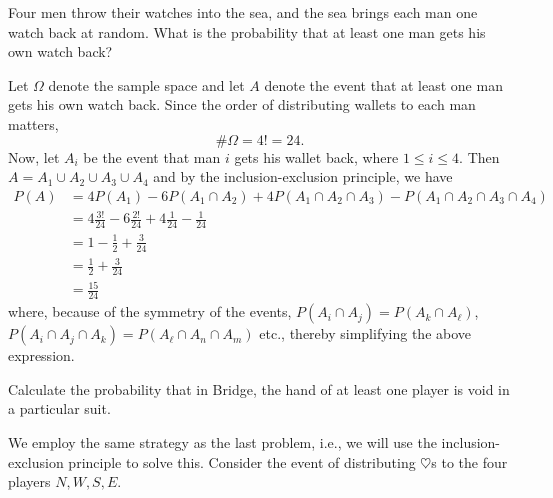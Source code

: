 \begin{problem}[Handout 2, \# 5]
  Four men throw their watches into the sea, and the sea brings each man
  one watch back at random. What is the probability that at least one man
  gets his own watch back?
\end{problem}
\begin{solution}
  Let \(\Omega\) denote the sample space and let \(A\) denote the event
  that at least one man gets his own watch back. Since the order of
  distributing wallets to each man matters,
  \[
    \#\Omega=4!=24.
  \]
  Now, let \(A_i\) be the event that man \(i\) gets his wallet back, where
  \(1\leq i\leq 4\). Then \(A=A_1\cup A_2\cup A_3\cup A_4\) and by the
  inclusion-exclusion principle, we have
  \begin{align*}
    P(A)
    &=4P(A_1)-6P(A_1\cap A_2)+4P(A_1\cap A_2\cap A_3)-P(A_1\cap A_2\cap
      A_3\cap A_4)\\
    &=4\frac{3!}{24}-6\frac{2!}{24}+4\frac{1}{24}-\frac{1}{24}\\
    &=1-\frac{1}{2}+\frac{3}{24}\\
    &=\frac{1}{2}+\frac{3}{24}\\
    &=\frac{15}{24}
  \end{align*}
  where, because of the symmetry of the events,
  \(P(A_i\cap A_j)=P(A_k\cap A_\ell)\),
  \(P(A_i\cap A_j\cap A_k)=P(A_\ell\cap A_n\cap A_m)\) etc., thereby
  simplifying the above expression.
\end{solution}
\newpage

\begin{problem}[Handout 2, \# 7]
  Calculate the probability that in Bridge, the hand of at least one player
  is void in a particular suit.
\end{problem}
\begin{solution}
  We employ the same strategy as the last problem, i.e., we will use the
  inclusion-exclusion principle to solve this. Consider the event of
  distributing \(\heartsuit\)s to the four players \(N,W,S,E\).
\end{solution}
\newpage

